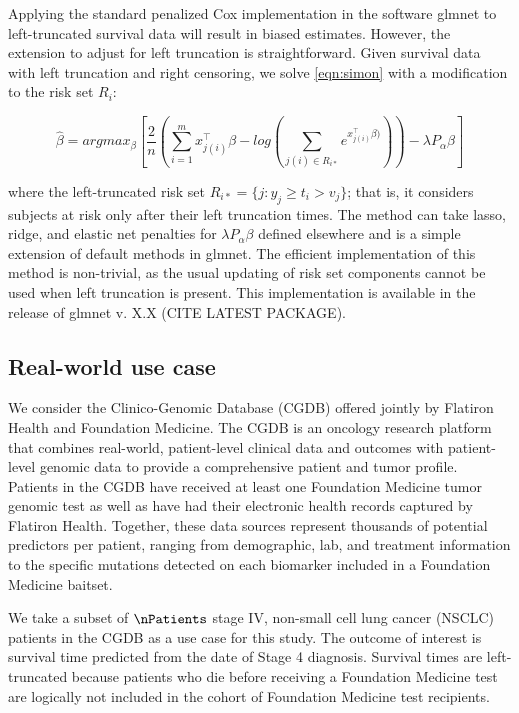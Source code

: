 \documentclass[11pt,final,fleqn]{article}\usepackage[]{graphicx}\usepackage[]{color}
\theoremstyle{plain}
\newcommand{\pkg}[1]{{\fontseries{b}\selectfont #1}}
\begin{document}
Applying the standard penalized Cox implementation in the software \pkg{glmnet} to left-truncated survival data will result in biased estimates. However, the extension to adjust for left truncation is straightforward. Given survival data with left truncation and right censoring, we solve \autoref{eqn:simon} with a modification to the risk set $R_i$:

\begin{equation}
\hat{\beta} = argmax_{\beta}  \left[ \frac{2}{n} \left( \sum_{i=1}^m x_{j(i)}^\intercal\beta - log\left(\sum_{j(i)\in R_{i\ast}}  e^{x_{j(i)}^\intercal\beta)}\right) \right)  - \lambda P_{\alpha}\beta  \right] 
\end{equation}

where the left-truncated risk set $R_{i\ast} = \{ j : y_j \geq t_i > v_j \}$; that is, it considers subjects at risk only after their left truncation times. The method can take lasso, ridge, and elastic net penalties for $\lambda P_{\alpha}\beta$ defined elsewhere \citep{friedman2010regularization} and is a simple extension of default methods in \pkg{glmnet}. The efficient implementation of this method is non-trivial, as the usual updating of risk set components cannot be used when left truncation is present. This implementation is available in the release of \pkg{glmnet} v. X.X (CITE LATEST PACKAGE).

\subsection{Real-world use case}
We consider the Clinico-Genomic Database (CGDB) offered jointly by Flatiron Health and Foundation Medicine. The CGDB is an oncology research platform that combines real-world, patient-level clinical data and outcomes with patient-level genomic data to provide a comprehensive patient and tumor profile. Patients in the CGDB have received at least one Foundation Medicine tumor genomic test as well as have had their electronic health records captured by Flatiron Health. Together, these data sources represent thousands of potential predictors per patient, ranging from demographic, lab, and treatment information to the specific mutations detected on each biomarker included in a Foundation Medicine baitset. 

We take a subset of $\nPatients$ stage IV, non-small cell lung cancer (NSCLC) patients in the CGDB as a use case for this study. The outcome of interest is survival time predicted from the date of Stage 4 diagnosis. Survival times are left-truncated because patients who die before receiving a Foundation Medicine test are logically not included in the cohort of Foundation Medicine test recipients. 
\end{document}
